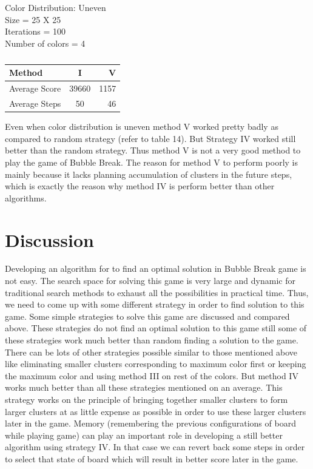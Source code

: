 \documentclass[twoside]{article}
\begin{document}
\begin{multicols}{2}
\begin{table}[H]
\caption{}
Color Distribution: Uneven\\
Size = 25 X 25	\\
Iterations = 100\\
Number of colors = 4	\\
\centering
\begin{tabular}{l | c| r}
\toprule
Method & I & V \\
\hline
Average Score & 39660 & 1157 \\
\hline
Average Steps & 50 & 46 \\
\hline
\bottomrule
\end{tabular}
\end{table}

Even when color distribution is uneven method V worked pretty badly as compared to random strategy (refer to table 14). But Strategy
IV worked still better than the random strategy. Thus method V is not a very good method to play the game of Bubble Break. The reason 
for method V to perform poorly is mainly because it lacks planning accumulation of clusters in the future steps, which is exactly the
reason why method IV is perform better than other algorithms.


\section{Discussion}

Developing an algorithm for to find an optimal solution in Bubble Break game is not easy. The search space for solving this game 
is very large and dynamic for traditional search methods to exhaust all the possibilities in practical time. Thus, we need to come 
up with some different strategy in order to find solution to this game. Some simple strategies to solve this game are discussed and 
compared above. These strategies do not find an optimal solution to this game still some of these strategies work much better than 
random finding a solution to the game. There can be lots of other strategies possible similar to those mentioned above like 
eliminating smaller clusters corresponding to maximum color first or keeping the maximum color and using method III on rest of the 
colors. But method IV works much better than all these strategies mentioned on an average. This strategy works on the principle of
bringing together smaller clusters to form larger clusters at as little expense as possible in order to use these larger clusters
later in the game. Memory (remembering the previous configurations of board while playing game) can play an important role in 
developing a still better algorithm using strategy IV. In that case we can revert back some steps in order to select that state of
board which will result in better score later in the game.


\end{multicols}
\end{document}
